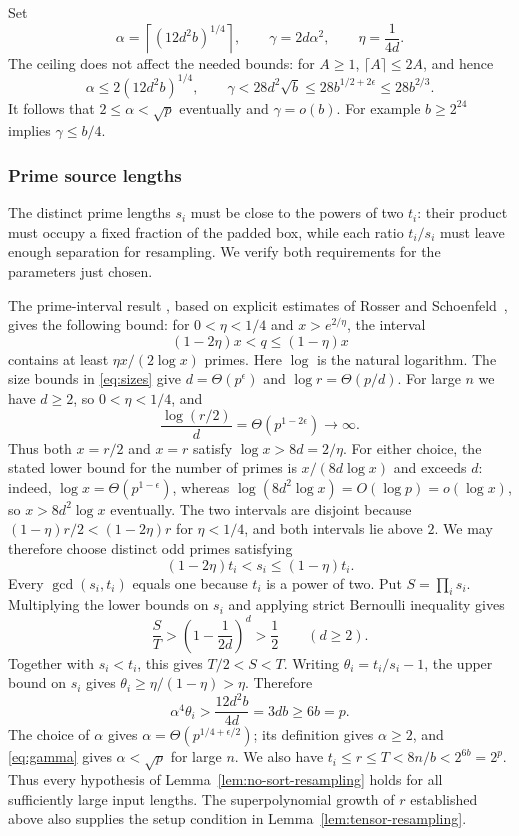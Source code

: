 Set
\[
 \alpha=\left\lceil(12d^2b)^{1/4}\right\rceil,
 \qquad \gamma=2d\alpha^2,\qquad \eta=\frac1{4d}.
\]
The ceiling does not affect the needed bounds: for $A\ge1$,
$\lceil A\rceil\le2A$, and hence
\begin{equation}\label{eq:gamma}
 \alpha\le2(12d^2b)^{1/4},\qquad
 \gamma<28d^2\sqrt b\le28b^{1/2+2\epsilon}\le28b^{2/3}.
\end{equation}
It follows that $2\le\alpha<\sqrt p$ eventually and $\gamma=o(b)$.
For example $b\ge2^{24}$ implies $\gamma\le b/4$.

\subsubsection{Prime source lengths}

The distinct prime lengths $s_i$ must be close to the powers of two
$t_i$: their product must occupy a fixed fraction of the padded box,
while each ratio $t_i/s_i$ must leave enough separation for resampling.
We verify both requirements for the parameters just chosen.

The prime-interval result
\cite[Lemma~5.1]{HarveyHoeven2021}, based on explicit estimates of
Rosser and Schoenfeld~\cite{RosserSchoenfeld1962}, gives the following
bound: for
$0<\eta<1/4$ and $x>e^{2/\eta}$, the interval
\[
 (1-2\eta)x<q\leq(1-\eta)x
\]
contains at least $\eta x/(2\log x)$ primes. Here $\log$ is the natural
logarithm. The size bounds in \eqref{eq:sizes} give
$d=\Theta(p^\epsilon)$ and $\log r=\Theta(p/d)$.
For large $n$ we have $d\geq2$, so
$0<\eta<1/4$, and
\[
 \frac{\log(r/2)}d=\Theta(p^{1-2\epsilon})\longrightarrow\infty.
\]
Thus both $x=r/2$ and $x=r$ satisfy $\log x>8d=2/\eta$.
For either choice, the stated lower bound for the number of primes is
$x/(8d\log x)$ and exceeds $d$:
indeed, $\log x=\Theta(p^{1-\epsilon})$, whereas
$\log(8d^2\log x)=O(\log p)=o(\log x)$, so $x>8d^2\log x$ eventually.
The two intervals are disjoint because
$(1-\eta)r/2<(1-2\eta)r$ for $\eta<1/4$, and both intervals lie above
$2$. We may therefore choose distinct odd primes satisfying
\[
 (1-2\eta)t_i<s_i\leq(1-\eta)t_i.
\]
Every $\gcd(s_i,t_i)$ equals one because $t_i$ is a power of two.
Put $S=\prod_i s_i$. Multiplying the lower bounds on $s_i$ and
applying strict Bernoulli inequality gives
\[
 \frac ST>
 \left(1-\frac1{2d}\right)^d>\frac12
 \qquad(d\geq2).
\]
Together with $s_i<t_i$, this gives $T/2<S<T$.
Writing $\theta_i=t_i/s_i-1$, the upper bound on $s_i$ gives
$\theta_i\geq\eta/(1-\eta)>\eta$. Therefore
\[
 \alpha^4\theta_i>\frac{12d^2b}{4d}=3db\geq6b=p.
\]
The choice of $\alpha$ gives
$\alpha=\Theta(p^{1/4+\epsilon/2})$; its definition gives $\alpha\geq2$,
and \eqref{eq:gamma} gives $\alpha<\sqrt p$ for large $n$. We also have
$t_i\leq r\leq T<8n/b<2^{6b}=2^p$.
Thus every hypothesis of Lemma~\ref{lem:no-sort-resampling} holds for
all sufficiently large input lengths. The superpolynomial growth of $r$
established above also supplies the setup condition in
Lemma~\ref{lem:tensor-resampling}.

